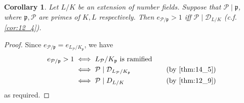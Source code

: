 \documentclass[11pt]{article}
\theoremstyle{definition}
\theoremstyle{plain}
\newtheorem{corollary}[definition]{Corollary}
\theoremstyle{remark}
\newcommand{\cD}{\mathcal{D}}
\newcommand{\cP}{\mathcal{P}}
\newcommand{\fp}{\mathfrak{p}}
\begin{document}
\begin{corollary}\label{cor:14_6}
    Let $L/K$ be an extension of number fields. Suppose that $\cP \mid \fp$, where $\fp, \cP$ are primes of $K, L$ respectively. Then $e_{\cP / \fp} > 1$ iff $\cP \mid \cD_{L/K}$ (c.f. \autoref{cor:12_4}).
\end{corollary}
\begin{proof}
    Since $e_{\cP/\fp} = e_{L_\cP/K_\fp}$, we have
    \begin{alignat*}{3}
        e_{\cP/\fp} > 1
        &\iff L_\cP / K_\fp \text{ is ramified}\\
        &\iff \cP \mid \cD_{L_\cP / K_\fp} &\quad\text{(by \autoref{thm:14_5})}\\
        &\iff \cP \mid D_{L/K} &\quad\text{(by \autoref{thm:12_9})}
    \end{alignat*}
    as required.
\end{proof}
\end{document}
